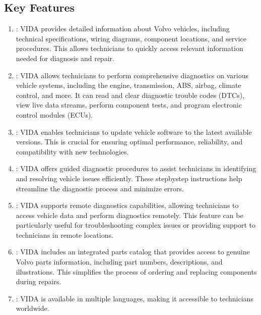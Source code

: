 \documentclass[letterpaper,10pt,english]{sphinxmanual}
\begin{document}
\subsection{Key Features}
\label{\detokenize{software/vida:key-features}}\begin{enumerate}
%
\item {} 
\sphinxAtStartPar
{}:
VIDA provides detailed information about Volvo vehicles, including technical specifications, wiring diagrams, component locations, and service procedures. This allows technicians to quickly access relevant information needed for diagnosis and repair.

\item {} 
\sphinxAtStartPar
{}:
VIDA allows technicians to perform comprehensive diagnostics on various vehicle systems, including the engine, transmission, ABS, airbag, climate control, and more. It can read and clear diagnostic trouble codes (DTCs), view live data streams, perform component tests, and program electronic control modules (ECUs).

\item {} 
\sphinxAtStartPar
{}:
VIDA enables technicians to update vehicle software to the latest available versions. This is crucial for ensuring optimal performance, reliability, and compatibility with new technologies.

\item {} 
\sphinxAtStartPar
{}:
VIDA offers guided diagnostic procedures to assist technicians in identifying and resolving vehicle issues efficiently. These step\sphinxhyphen{}by\sphinxhyphen{}step instructions help streamline the diagnostic process and minimize errors.

\item {} 
\sphinxAtStartPar
{}:
VIDA supports remote diagnostics capabilities, allowing technicians to access vehicle data and perform diagnostics remotely. This feature can be particularly useful for troubleshooting complex issues or providing support to technicians in remote locations.

\item {} 
\sphinxAtStartPar
{}:
VIDA includes an integrated parts catalog that provides access to genuine Volvo parts information, including part numbers, descriptions, and illustrations. This simplifies the process of ordering and replacing components during repairs.

\item {} 
\sphinxAtStartPar
{}:
VIDA is available in multiple languages, making it accessible to technicians worldwide.

\end{enumerate}
\end{document}
